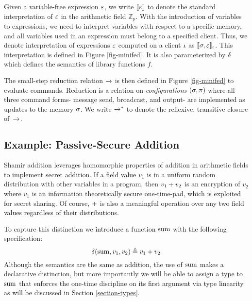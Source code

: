 Given a variable-free expression $\varepsilon$, we write $\llbracket \varepsilon \rrbracket$ to denote
the standard interpretation of $\varepsilon$ in the arithmetic field
$\mathbb{Z}_{p}$. With the introduction of variables to expressions,
we need to interpret variables with respect to a specific memory, and
all variables used in an expression must belong to a specified client.
Thus, we denote interpretation of expressions $\varepsilon$ computed on a
client $\iota$ as $\llbracket \sigma,\varepsilon \rrbracket_{\iota}$. This interpretation is
defined in Figure \ref{fig-minifed}. It is also parameterized by
$\delta$ which defines the semantics of library functions $f$.

The small-step reduction relation $\xrightarrow{}$ is then defined in Figure
\ref{fig-minifed} to evaluate commands. Reduction is a relation on
\emph{configurations} $(\sigma, \pi)$ where all three command forms-
message send, broadcast, and output- are implemented as updates to the
memory $\sigma$. We write $\xrightarrow{}^{*}$ to denote the reflexive, transitive
closure of\ $\xrightarrow{}$. 

\subsection{Example: Passive-Secure Addition}

Shamir addition leverages homomorphic properties of addition in
arithmetic fields to implement secret addition. If a field value $v_1$
is in a uniform random distribution with other variables in a program,
then $v_1 + v_2$ is an encryption of $v_2$ where $v_1$ is an
information theoretically secure one-time-pad, which is exploited for
secret sharing. Of course, $+$ is also a meaningful operation
over any two field values regardless of their distributions.

To capture this distinction we introduce a function $\mathrm{sum}$
with the following specification:
$$
\delta(\mathrm{sum},v_1,v_2) \triangleq v_1 + v_2
$$
Although the semantics are the same as addition, the use of $\mathrm{sum}$
makes a declarative distinction, but more importantly we will be
able to assign a type to $\mathrm{sum}$ that enforces the one-time discipline
on its first argument via type linearity as will be discussed in Section
\ref{section-types}.

